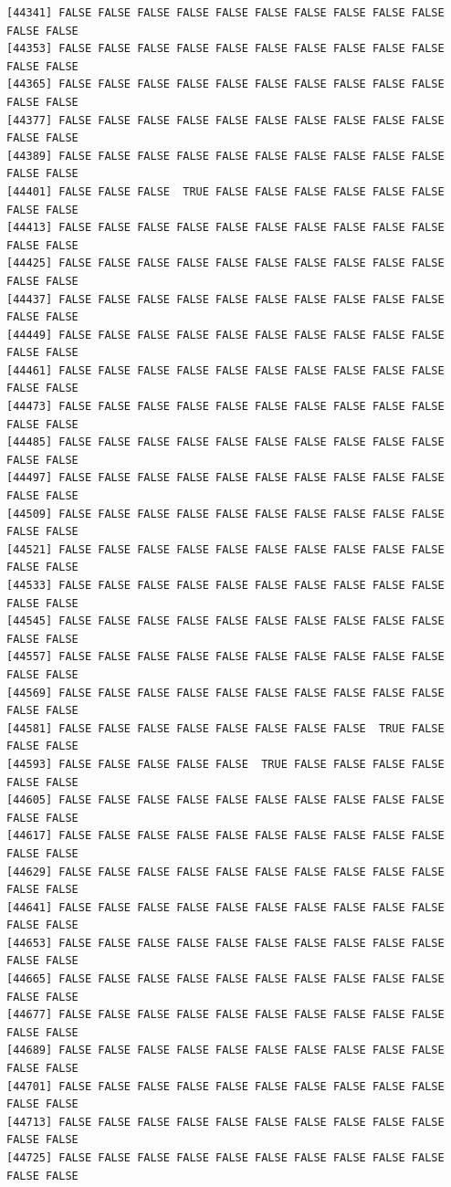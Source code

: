 \documentclass[
  a4paper,
  DIV=11,
  numbers=noendperiod]{scrartcl}
\begin{document}
\begin{verbatim}
[44341] FALSE FALSE FALSE FALSE FALSE FALSE FALSE FALSE FALSE FALSE FALSE FALSE
[44353] FALSE FALSE FALSE FALSE FALSE FALSE FALSE FALSE FALSE FALSE FALSE FALSE
[44365] FALSE FALSE FALSE FALSE FALSE FALSE FALSE FALSE FALSE FALSE FALSE FALSE
[44377] FALSE FALSE FALSE FALSE FALSE FALSE FALSE FALSE FALSE FALSE FALSE FALSE
[44389] FALSE FALSE FALSE FALSE FALSE FALSE FALSE FALSE FALSE FALSE FALSE FALSE
[44401] FALSE FALSE FALSE  TRUE FALSE FALSE FALSE FALSE FALSE FALSE FALSE FALSE
[44413] FALSE FALSE FALSE FALSE FALSE FALSE FALSE FALSE FALSE FALSE FALSE FALSE
[44425] FALSE FALSE FALSE FALSE FALSE FALSE FALSE FALSE FALSE FALSE FALSE FALSE
[44437] FALSE FALSE FALSE FALSE FALSE FALSE FALSE FALSE FALSE FALSE FALSE FALSE
[44449] FALSE FALSE FALSE FALSE FALSE FALSE FALSE FALSE FALSE FALSE FALSE FALSE
[44461] FALSE FALSE FALSE FALSE FALSE FALSE FALSE FALSE FALSE FALSE FALSE FALSE
[44473] FALSE FALSE FALSE FALSE FALSE FALSE FALSE FALSE FALSE FALSE FALSE FALSE
[44485] FALSE FALSE FALSE FALSE FALSE FALSE FALSE FALSE FALSE FALSE FALSE FALSE
[44497] FALSE FALSE FALSE FALSE FALSE FALSE FALSE FALSE FALSE FALSE FALSE FALSE
[44509] FALSE FALSE FALSE FALSE FALSE FALSE FALSE FALSE FALSE FALSE FALSE FALSE
[44521] FALSE FALSE FALSE FALSE FALSE FALSE FALSE FALSE FALSE FALSE FALSE FALSE
[44533] FALSE FALSE FALSE FALSE FALSE FALSE FALSE FALSE FALSE FALSE FALSE FALSE
[44545] FALSE FALSE FALSE FALSE FALSE FALSE FALSE FALSE FALSE FALSE FALSE FALSE
[44557] FALSE FALSE FALSE FALSE FALSE FALSE FALSE FALSE FALSE FALSE FALSE FALSE
[44569] FALSE FALSE FALSE FALSE FALSE FALSE FALSE FALSE FALSE FALSE FALSE FALSE
[44581] FALSE FALSE FALSE FALSE FALSE FALSE FALSE FALSE  TRUE FALSE FALSE FALSE
[44593] FALSE FALSE FALSE FALSE FALSE  TRUE FALSE FALSE FALSE FALSE FALSE FALSE
[44605] FALSE FALSE FALSE FALSE FALSE FALSE FALSE FALSE FALSE FALSE FALSE FALSE
[44617] FALSE FALSE FALSE FALSE FALSE FALSE FALSE FALSE FALSE FALSE FALSE FALSE
[44629] FALSE FALSE FALSE FALSE FALSE FALSE FALSE FALSE FALSE FALSE FALSE FALSE
[44641] FALSE FALSE FALSE FALSE FALSE FALSE FALSE FALSE FALSE FALSE FALSE FALSE
[44653] FALSE FALSE FALSE FALSE FALSE FALSE FALSE FALSE FALSE FALSE FALSE FALSE
[44665] FALSE FALSE FALSE FALSE FALSE FALSE FALSE FALSE FALSE FALSE FALSE FALSE
[44677] FALSE FALSE FALSE FALSE FALSE FALSE FALSE FALSE FALSE FALSE FALSE FALSE
[44689] FALSE FALSE FALSE FALSE FALSE FALSE FALSE FALSE FALSE FALSE FALSE FALSE
[44701] FALSE FALSE FALSE FALSE FALSE FALSE FALSE FALSE FALSE FALSE FALSE FALSE
[44713] FALSE FALSE FALSE FALSE FALSE FALSE FALSE FALSE FALSE FALSE FALSE FALSE
[44725] FALSE FALSE FALSE FALSE FALSE FALSE FALSE FALSE FALSE FALSE FALSE FALSE

\end{verbatim}
\end{document}
